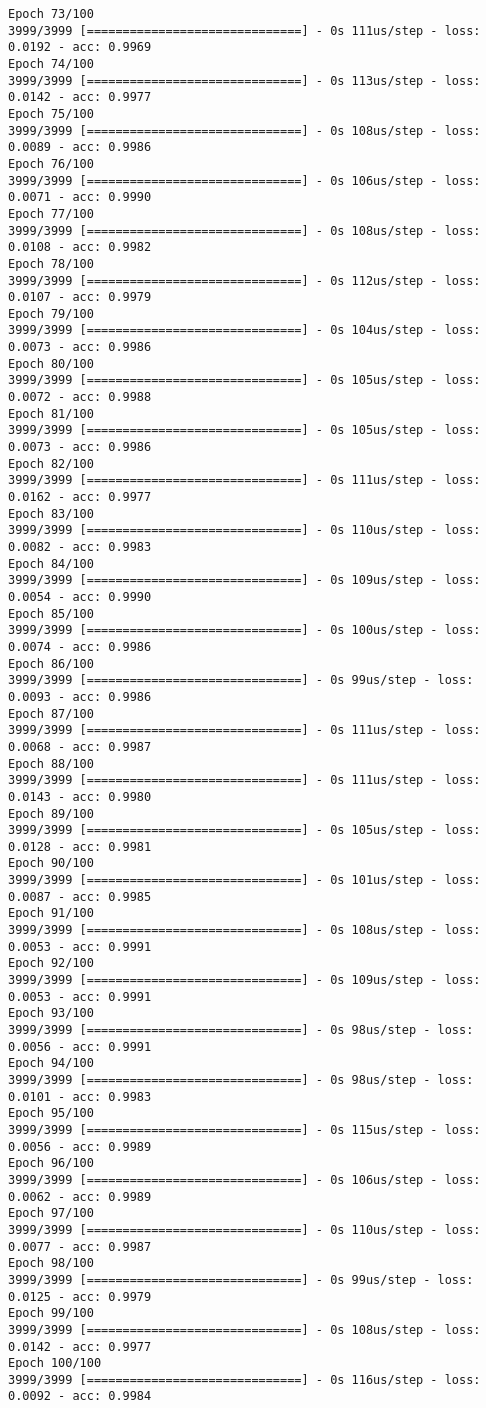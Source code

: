 \documentclass[11pt]{article}
\begin{document}
\begin{Verbatim}[commandchars=\\\{\}]
Epoch 73/100
3999/3999 [==============================] - 0s 111us/step - loss: 0.0192 - acc: 0.9969
Epoch 74/100
3999/3999 [==============================] - 0s 113us/step - loss: 0.0142 - acc: 0.9977
Epoch 75/100
3999/3999 [==============================] - 0s 108us/step - loss: 0.0089 - acc: 0.9986
Epoch 76/100
3999/3999 [==============================] - 0s 106us/step - loss: 0.0071 - acc: 0.9990
Epoch 77/100
3999/3999 [==============================] - 0s 108us/step - loss: 0.0108 - acc: 0.9982
Epoch 78/100
3999/3999 [==============================] - 0s 112us/step - loss: 0.0107 - acc: 0.9979
Epoch 79/100
3999/3999 [==============================] - 0s 104us/step - loss: 0.0073 - acc: 0.9986
Epoch 80/100
3999/3999 [==============================] - 0s 105us/step - loss: 0.0072 - acc: 0.9988
Epoch 81/100
3999/3999 [==============================] - 0s 105us/step - loss: 0.0073 - acc: 0.9986
Epoch 82/100
3999/3999 [==============================] - 0s 111us/step - loss: 0.0162 - acc: 0.9977
Epoch 83/100
3999/3999 [==============================] - 0s 110us/step - loss: 0.0082 - acc: 0.9983
Epoch 84/100
3999/3999 [==============================] - 0s 109us/step - loss: 0.0054 - acc: 0.9990
Epoch 85/100
3999/3999 [==============================] - 0s 100us/step - loss: 0.0074 - acc: 0.9986
Epoch 86/100
3999/3999 [==============================] - 0s 99us/step - loss: 0.0093 - acc: 0.9986
Epoch 87/100
3999/3999 [==============================] - 0s 111us/step - loss: 0.0068 - acc: 0.9987
Epoch 88/100
3999/3999 [==============================] - 0s 111us/step - loss: 0.0143 - acc: 0.9980
Epoch 89/100
3999/3999 [==============================] - 0s 105us/step - loss: 0.0128 - acc: 0.9981
Epoch 90/100
3999/3999 [==============================] - 0s 101us/step - loss: 0.0087 - acc: 0.9985
Epoch 91/100
3999/3999 [==============================] - 0s 108us/step - loss: 0.0053 - acc: 0.9991
Epoch 92/100
3999/3999 [==============================] - 0s 109us/step - loss: 0.0053 - acc: 0.9991
Epoch 93/100
3999/3999 [==============================] - 0s 98us/step - loss: 0.0056 - acc: 0.9991
Epoch 94/100
3999/3999 [==============================] - 0s 98us/step - loss: 0.0101 - acc: 0.9983
Epoch 95/100
3999/3999 [==============================] - 0s 115us/step - loss: 0.0056 - acc: 0.9989
Epoch 96/100
3999/3999 [==============================] - 0s 106us/step - loss: 0.0062 - acc: 0.9989
Epoch 97/100
3999/3999 [==============================] - 0s 110us/step - loss: 0.0077 - acc: 0.9987
Epoch 98/100
3999/3999 [==============================] - 0s 99us/step - loss: 0.0125 - acc: 0.9979
Epoch 99/100
3999/3999 [==============================] - 0s 108us/step - loss: 0.0142 - acc: 0.9977
Epoch 100/100
3999/3999 [==============================] - 0s 116us/step - loss: 0.0092 - acc: 0.9984

    \end{Verbatim}
\end{document}

